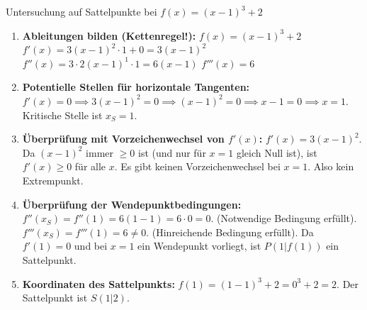 \begin{beispielumgebung}{Untersuchung auf Sattelpunkte bei \texorpdfstring{$f(x) = (x-1)^3 + 2$}{f(x) = (x-1) hoch 3 + 2}}
\begin{enumerate}
    \item \textbf{Ableitungen bilden (Kettenregel!):}
        $f(x) = (x-1)^3 + 2$
        $f'(x) = 3(x-1)^2 \cdot 1 + 0 = 3(x-1)^2$
        $f''(x) = 3 \cdot 2(x-1)^1 \cdot 1 = 6(x-1)$
        $f'''(x) = 6$

    \item \textbf{Potentielle Stellen für horizontale Tangenten:}
        $f'(x) = 0 \implies 3(x-1)^2 = 0 \implies (x-1)^2 = 0 \implies x-1=0 \implies x = 1$.
        Kritische Stelle ist $x_S = 1$.

    \item \textbf{Überprüfung mit Vorzeichenwechsel von $f'(x)$:}
        $f'(x) = 3(x-1)^2$. Da $(x-1)^2$ immer $\ge 0$ ist (und nur für $x=1$ gleich Null ist), ist $f'(x) \ge 0$ für alle $x$.
        Es gibt keinen Vorzeichenwechsel bei $x=1$. Also kein Extrempunkt.

    \item \textbf{Überprüfung der Wendepunktbedingungen:}
        $f''(x_S) = f''(1) = 6(1-1) = 6 \cdot 0 = 0$. (Notwendige Bedingung erfüllt).
        $f'''(x_S) = f'''(1) = 6 \neq 0$. (Hinreichende Bedingung erfüllt).
        Da $f'(1)=0$ und bei $x=1$ ein Wendepunkt vorliegt, ist $P(1|f(1))$ ein Sattelpunkt.

    \item \textbf{Koordinaten des Sattelpunkts:}
        $f(1) = (1-1)^3 + 2 = 0^3 + 2 = 2$.
        Der Sattelpunkt ist $S(1|2)$.
\end{enumerate}
\end{beispielumgebung}

